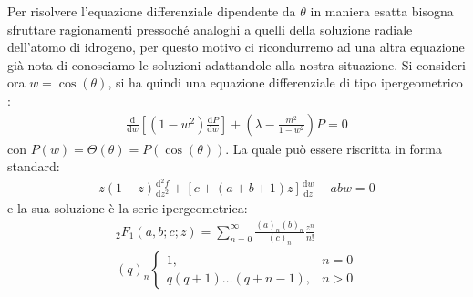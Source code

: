 Per risolvere l'equazione differenziale dipendente da $\theta$ in maniera esatta bisogna sfruttare ragionamenti pressoché analoghi a quelli della soluzione radiale dell'atomo di idrogeno, per questo motivo ci ricondurremo ad una altra equazione già nota di conosciamo le soluzioni adattandole alla nostra situazione.  
Si consideri ora $w=\cos{\left(\theta\right)}$, si ha quindi una equazione differenziale di tipo ipergeometrico :
\begin{equation}\begin{split}
\frac{\textrm{d}}{\textrm{d}w}\left[\left(1-w^2\right)\frac{\textrm{d}P}{\textrm{d}w}\right]+\left(\lambda-\frac{m^2}{1-w^2}\right)P=0
\end{split}\end{equation}
con $P\left(w\right)=\Theta\left(\theta\right)=P\left(\cos{\left(\theta\right)}\right)$. 
La quale può essere riscritta in forma standard:
\begin{equation}\begin{split}
z\left(1-z\right)\frac{\textrm{d}^2f}{\textrm{d}z^2}+\left[c+\left(a+b+1\right)z\right]\frac{\textrm{d}w}{\textrm{d}z}-abw=0
\end{split}\end{equation}
e la sua soluzione è la serie ipergeometrica:
\begin{equation}\begin{split}
_2F_1\left(a,b;c;z\right)=\sum_{n=0}^{\infty }{\frac{\left(a\right)_n\left(b\right)_n}{\left(c\right)_n}\frac{z^n}{n!}} \\
\left(q\right)_n
\begin{cases}
1, & n=0 \\
q\left(q+1\right)\dots\left(q+n-1\right), & n>0
\end{cases}
\end{split}\end{equation}

